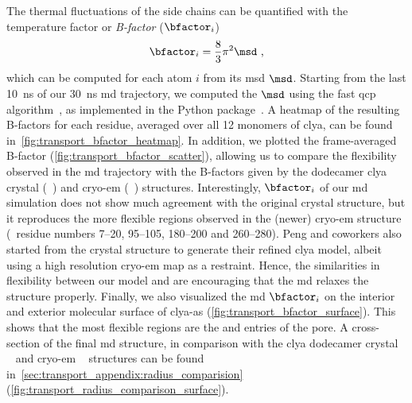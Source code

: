 The thermal fluctuations of the side chains can be quantified with the temperature factor or \emph{B-factor}
($\bfactor_i$)~\cite{Bahar-1997}
%
\begin{align}\label{eq:bfactor}
  \bfactor_i = \dfrac{8}{3} \pi^2 \msd \text{ ,}
\end{align}
%
which can be computed for each atom $i$ from its \gls{msd} $\msd$. Starting from the last \SI{10}{\ns} of our
\SI{30}{\ns} \gls{md} trajectory, we computed the $\msd$ using the fast \gls{qcp}
algorithm~\cite{Theobald-2005,Liu-2010}, as implemented in the  Python
package~\cite{MichaudAgrawal-2011}. A heatmap of the resulting B-factors for each residue, averaged over all
12 monomers of \gls{clya}, can be found in~\cref{fig:transport_bfactor_heatmap}. In addition, we plotted the
frame-averaged B-factor (\cref{fig:transport_bfactor_scatter}), allowing us to compare the flexibility
observed in the \gls{md} trajectory with the B-factors given by the dodecamer \gls{clya} crystal
(~\cite{Mueller-2009}) and \gls{cryo-em} (~\cite{Peng-2019}) structures.
Interestingly, $\bfactor_i$ of our \gls{md} simulation does not show much agreement with the original
 crystal structure, but it reproduces the more flexible regions observed in the (newer)
 \gls{cryo-em} structure (\ie~residue numbers \numrange{7}{20}, \numrange{95}{105},
\numrange{180}{200} and \numrange{260}{280}). Peng and coworkers also started from the  crystal
structure to generate their refined \gls{clya} model, albeit using a high resolution \gls{cryo-em} map as a
restraint. Hence, the similarities in flexibility between our model and  are encouraging that the
\gls{md} relaxes the structure properly. Finally, we also visualized the  \gls{md} $\bfactor_i$ on the
interior and exterior molecular surface of \gls{clya-as} (\cref{fig:transport_bfactor_surface}). This shows
that the most flexible regions are the \cisi{} and \transi{} entries of the pore. A cross-section of the final
\gls{md} structure, in comparison with the \gls{clya} dodecamer crystal ~\cite{Mueller-2009} and
\gls{cryo-em} ~\cite{Peng-2019} structures can be found
in~\cref{sec:transport_appendix:radius_comparision} (\cref{fig:transport_radius_comparison_surface}).


